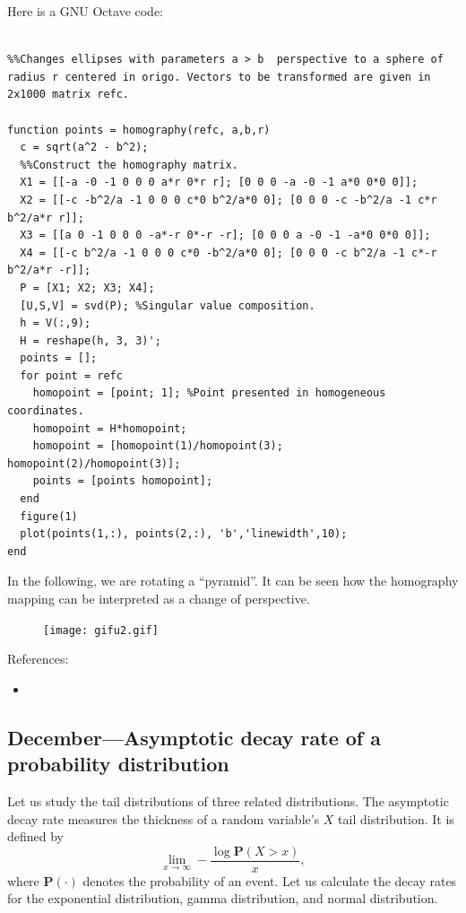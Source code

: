 \documentclass{article}
\begin{document}
Here is a GNU Octave code:
\begin{verbatim}

%%Changes ellipses with parameters a > b  perspective to a sphere of radius r centered in origo. Vectors to be transformed are given in 2x1000 matrix refc.

function points = homography(refc, a,b,r)
  c = sqrt(a^2 - b^2);
  %%Construct the homography matrix.
  X1 = [[-a -0 -1 0 0 0 a*r 0*r r]; [0 0 0 -a -0 -1 a*0 0*0 0]];
  X2 = [[-c -b^2/a -1 0 0 0 c*0 b^2/a*0 0]; [0 0 0 -c -b^2/a -1 c*r b^2/a*r r]];
  X3 = [[a 0 -1 0 0 0 -a*-r 0*-r -r]; [0 0 0 a -0 -1 -a*0 0*0 0]];
  X4 = [[-c b^2/a -1 0 0 0 c*0 -b^2/a*0 0]; [0 0 0 -c b^2/a -1 c*-r b^2/a*r -r]];
  P = [X1; X2; X3; X4];
  [U,S,V] = svd(P); %Singular value composition.
  h = V(:,9);
  H = reshape(h, 3, 3)';
  points = [];
  for point = refc
    homopoint = [point; 1]; %Point presented in homogeneous coordinates.
    homopoint = H*homopoint;
    homopoint = [homopoint(1)/homopoint(3); homopoint(2)/homopoint(3)];
    points = [points homopoint];
  end
  figure(1)
  plot(points(1,:), points(2,:), 'b','linewidth',10);
end

\end{verbatim}

In the following, we are rotating a ``pyramid''. It can be seen how the homography mapping can be interpreted as a change of perspective.

\begin{figure}
  \texttt{[image: gifu2.gif]}
\end{figure}

References:
\begin{itemize}
\item {}
\end{itemize}


\subsection{December---Asymptotic decay rate of a probability distribution}


Let us study the tail distributions of three related distributions. The asymptotic decay rate measures the thickness of a random variable's $X$ tail distribution. It is defined by
\begin{equation}
  \lim_{x \rightarrow \infty} -\frac{\log\textbf{P}(X > x)}{x}, \tag{1}
\end{equation}
where $\textbf{P}(\cdot)$ denotes the probability of an event. Let us calculate the decay rates for the exponential distribution, gamma distribution, and normal distribution.
\end{document}
